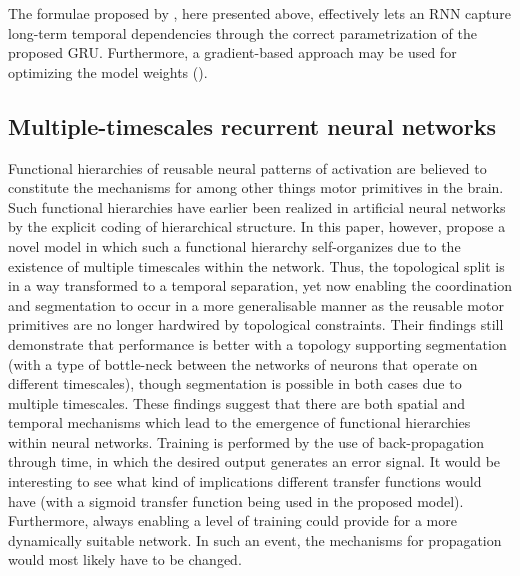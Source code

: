 The formulae proposed by \cite{Cho2014}, here presented above, effectively lets an RNN capture long-term temporal dependencies through the correct parametrization of the proposed GRU. Furthermore, a gradient-based approach may be used for optimizing the model weights (\cite{Cho2014}).


\subsection{Multiple-timescales recurrent neural networks}

Functional hierarchies of reusable neural patterns of activation are believed to constitute the mechanisms for among other things motor primitives in the brain. Such functional hierarchies have earlier been realized in artificial neural networks by the explicit coding of hierarchical structure. In this paper, however, \cite{Yamashita2008} propose a novel model in which such a functional hierarchy self-organizes due to the existence of multiple timescales within the network. Thus, the topological split is in a way transformed to a temporal separation, yet now enabling the coordination and segmentation to occur in a more generalisable manner as the reusable motor primitives are no longer hardwired by topological constraints. Their findings still demonstrate that performance is better with a topology supporting segmentation (with a type of bottle-neck between the networks of neurons that operate on different timescales), though segmentation is possible in both cases due to multiple timescales. These findings suggest that there are both spatial and temporal mechanisms which lead to the emergence of functional hierarchies within neural networks. Training is performed by the use of back-propagation through time, in which the desired output generates an error signal. It would be interesting to see what kind of implications different transfer functions would have (with a sigmoid transfer function being used in the proposed model). Furthermore, always enabling a level of training could provide for a more dynamically suitable network. In such an event, the mechanisms for propagation would most likely have to be changed.

